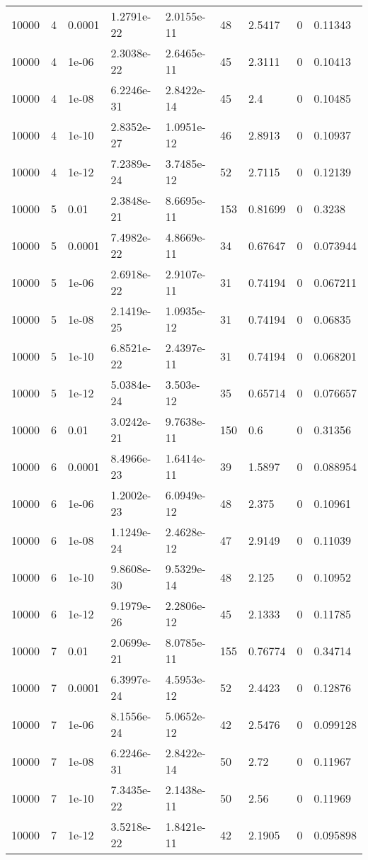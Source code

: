 \begin{tabular}{lllllllll}
10000 & 4 & 0.0001 & 1.2791e-22 & 2.0155e-11 & 48 & 2.5417 & 0 & 0.11343 \\ 
10000 & 4 & 1e-06 & 2.3038e-22 & 2.6465e-11 & 45 & 2.3111 & 0 & 0.10413 \\ 
10000 & 4 & 1e-08 & 6.2246e-31 & 2.8422e-14 & 45 & 2.4 & 0 & 0.10485 \\ 
10000 & 4 & 1e-10 & 2.8352e-27 & 1.0951e-12 & 46 & 2.8913 & 0 & 0.10937 \\ 
10000 & 4 & 1e-12 & 7.2389e-24 & 3.7485e-12 & 52 & 2.7115 & 0 & 0.12139 \\ 
10000 & 5 & 0.01 & 2.3848e-21 & 8.6695e-11 & 153 & 0.81699 & 0 & 0.3238 \\ 
10000 & 5 & 0.0001 & 7.4982e-22 & 4.8669e-11 & 34 & 0.67647 & 0 & 0.073944 \\ 
10000 & 5 & 1e-06 & 2.6918e-22 & 2.9107e-11 & 31 & 0.74194 & 0 & 0.067211 \\ 
10000 & 5 & 1e-08 & 2.1419e-25 & 1.0935e-12 & 31 & 0.74194 & 0 & 0.06835 \\ 
10000 & 5 & 1e-10 & 6.8521e-22 & 2.4397e-11 & 31 & 0.74194 & 0 & 0.068201 \\ 
10000 & 5 & 1e-12 & 5.0384e-24 & 3.503e-12 & 35 & 0.65714 & 0 & 0.076657 \\ 
10000 & 6 & 0.01 & 3.0242e-21 & 9.7638e-11 & 150 & 0.6 & 0 & 0.31356 \\ 
10000 & 6 & 0.0001 & 8.4966e-23 & 1.6414e-11 & 39 & 1.5897 & 0 & 0.088954 \\ 
10000 & 6 & 1e-06 & 1.2002e-23 & 6.0949e-12 & 48 & 2.375 & 0 & 0.10961 \\ 
10000 & 6 & 1e-08 & 1.1249e-24 & 2.4628e-12 & 47 & 2.9149 & 0 & 0.11039 \\ 
10000 & 6 & 1e-10 & 9.8608e-30 & 9.5329e-14 & 48 & 2.125 & 0 & 0.10952 \\ 
10000 & 6 & 1e-12 & 9.1979e-26 & 2.2806e-12 & 45 & 2.1333 & 0 & 0.11785 \\ 
10000 & 7 & 0.01 & 2.0699e-21 & 8.0785e-11 & 155 & 0.76774 & 0 & 0.34714 \\ 
10000 & 7 & 0.0001 & 6.3997e-24 & 4.5953e-12 & 52 & 2.4423 & 0 & 0.12876 \\ 
10000 & 7 & 1e-06 & 8.1556e-24 & 5.0652e-12 & 42 & 2.5476 & 0 & 0.099128 \\ 
10000 & 7 & 1e-08 & 6.2246e-31 & 2.8422e-14 & 50 & 2.72 & 0 & 0.11967 \\ 
10000 & 7 & 1e-10 & 7.3435e-22 & 2.1438e-11 & 50 & 2.56 & 0 & 0.11969 \\ 
10000 & 7 & 1e-12 & 3.5218e-22 & 1.8421e-11 & 42 & 2.1905 & 0 & 0.095898 \\ 

\end{tabular}
